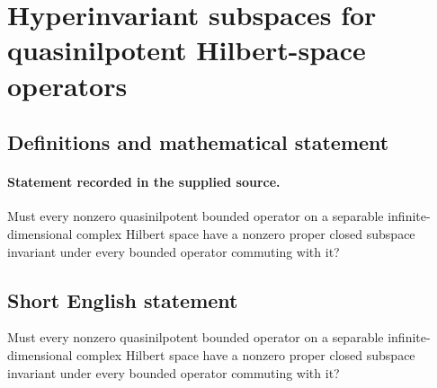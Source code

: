 \documentclass[11pt]{article}
\begin{document}
\section*{Hyperinvariant subspaces for quasinilpotent Hilbert-space operators}\label{statement}
\subsection{Definitions and mathematical statement}
\paragraph{Statement recorded in the supplied source.}
Must every nonzero quasinilpotent bounded operator on a separable infinite-dimensional complex Hilbert space have a nonzero proper closed subspace invariant under every bounded operator commuting with it?
\subsection{Short English statement}
Must every nonzero quasinilpotent bounded operator on a separable infinite-dimensional complex Hilbert space have a nonzero proper closed subspace invariant under every bounded operator commuting with it?
\end{document}
